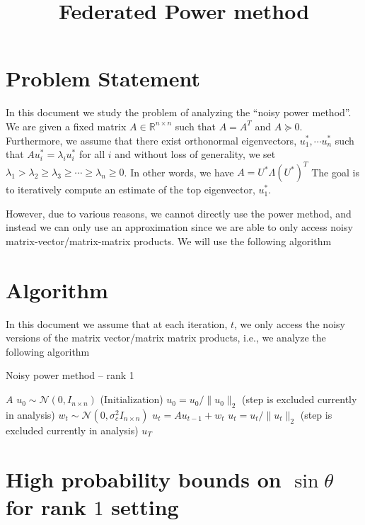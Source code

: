 \documentclass[10pt]{article}
\title{\textbf{Federated Power method}}
\author{}
\date{}
\newcommand{\R}{\mathbb{R}}
\begin{document}
\maketitle


\section{Problem Statement}
In this document we study the problem of analyzing the ``noisy power method''. We are given a fixed matrix $A \in \R^{n \times n}$ such that $A = A^T$ and $A \succeq 0$. Furthermore, we assume that there exist orthonormal eigenvectors, $u_1^*, \cdots u_n^*$ such that $A u_i^* = \lambda_i u_i^*$ for all $i$ and without loss of generality, we set $\lambda_1 > \lambda_2 \geq \lambda_3 \geq \cdots \geq \lambda_n \geq 0$. In other words, we have $A = U^* \Lambda (U^*)^T$ The goal is to iteratively compute an estimate of the top eigenvector, $u_1^*$. 

However, due to various reasons, we cannot directly use the power method, and instead we can only use an approximation since we are able to only access noisy matrix-vector/matrix-matrix  products. We will use the following algorithm

\section{Algorithm}
In this document we assume that at each iteration, $t$, we only access the noisy versions of the matrix vector/matrix matrix products, i.e., we analyze the following algorithm

\newcommand{\Y}{\bm{Y}}
\newcommand{\z}{\bm{z}}
\begin{algorithm}[H]
\caption{Noisy power method -- rank 1}\label{algo:rank1}
  \begin{algorithmic}[1]
    \REQUIRE $A$ 
    \STATE $u_0 \sim \mathcal{N}(0, I_{n\times n})$ (Initialization) 
    \STATE $u_0 = u_0/\|u_0\|_2$ (step is excluded currently in analysis)
    \STATE $w_t \sim \mathcal{N}(0, \sigma_c^2 I_{n\times n})$
    \STATE $u_t = A u_{t-1} + w_t$ 
    \STATE $u_t = u_t / \|u_t\|_2$ (step is excluded currently in analysis)
    \ENDFOR
    \ENSURE $u_T$ 
  \end{algorithmic}
\end{algorithm}

\newcommand{\E}{\mathbb{E}}
\section{High probability bounds on $\sin\theta$ for rank $1$ setting}
\end{document}
